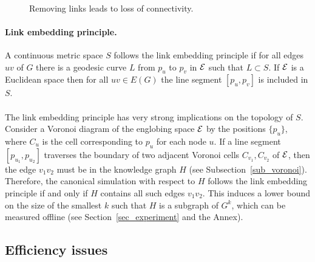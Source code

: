 \documentclass{article}
\newcommand{\englobing}{{\cal E}}
\begin{document}
\begin{figure}[h]
\begin{center}
\hspace{1cm}
\\
\hspace{1cm}
\caption{Removing links leads to loss of connectivity.}
\label{fig_cldp}
\end{center}
\end{figure}

\paragraph{Link embedding principle.} A continuous metric space $S$ follows the link embedding principle if for all edges $uv$ of $G$ there is a geodesic curve $L$ from $p_u$ to $p_v$ in $\englobing$ such that $L\subset S$. If $\englobing$ is a Euclidean space then for all $uv\in E(G)$ the line segment $[p_u,p_v]$ is included in $S$.

\paragraph{}
The link embedding principle has very strong implications on the topology of $S$. Consider a Voronoi diagram of the englobing space $\englobing$ by the positions $\{p_u\}$, where $C_u$ is the cell corresponding to $p_u$ for each node $u$. If a line segment $[p_{u_1},p_{u_2}]$ traverses the boundary of two adjacent Voronoi cells $C_{v_1},C_{v_2}$ of $\englobing$, then the edge $v_1v_2$ must be in the knowledge graph $H$ (see Subsection~\ref{sub_voronoi}). 
Therefore, the canonical simulation with respect to $H$ follows the link embedding principle if and only if $H$ contains all such edges $v_1v_2$.
This induces a lower bound on the size of the smallest $k$ such that $H$ is a subgraph of $G^k$, which can be measured offline (see Section~\ref{sec_experiment} and the Annex). 

\subsection{Efficiency issues}
\label{sub_spanning}
\end{document}
